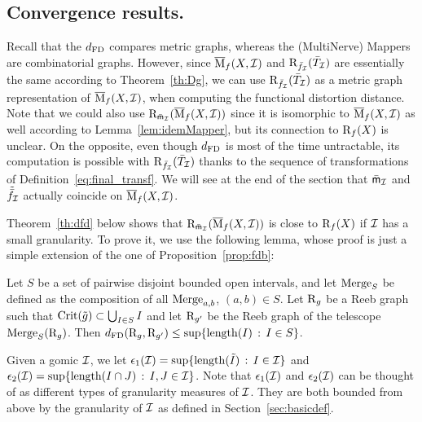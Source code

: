 \subsection{Convergence results.}
\label{sec:dfdconv}

Recall that the $d_{\rm FD}$ compares metric graphs, whereas the (MultiNerve) Mappers
are combinatorial graphs.
However, since $\overline{\mathrm{M}}_f(X,\mathcal{I})$ and $\mathrm{R}_{\bar f_{\mathcal I}}(\bar T_{\mathcal I})$ are essentially the same according to Theorem~\ref{th:Dg},
we can use $\mathrm{R}_{\bar f_{\mathcal I}}(\bar T_{\mathcal I})$ as a metric graph representation of $\overline{\mathrm{M}}_f(X,\mathcal{I})$,   
when computing the functional distortion distance.
Note that we could also use $\mathrm{R}_{\bar {\sf{m}}_{\mathcal I}}(\overline{\mathrm{M}}_f(X,\mathcal{I}))$ since it is isomorphic to $\overline{\mathrm{M}}_f(X,\mathcal{I})$ as well according to Lemma~\ref{lem:idemMapper},
but its connection to $\mathrm{R}_f(X)$ is unclear. %
On the opposite, even though $d_{\rm FD}$ is most of the time untractable, its computation is possible with $\mathrm{R}_{\bar f_{\mathcal I}}(\bar T_{\mathcal I})$
thanks to the sequence of transformations of Definition~\ref{eq:final_transf}.
We will see at the end of the section that $\bar {\sf{m}}_{\mathcal I}$ and $\tilde{\bar f}_{\mathcal I}$ actually coincide on $\overline{\mathrm{M}}_f(X,\mathcal{I})$.

Theorem~\ref{th:dfd} below shows that $\mathrm{R}_{\bar {\sf{m}}_{\mathcal I}}(\overline{\mathrm{M}}_f(X,\mathcal{I}))$ is close to $\mathrm{R}_f(X)$ if $\mathcal{I}$ has a small granularity. To prove it,
we use the following lemma, whose proof is just a simple extension of the one of Proposition~\ref{prop:fdb}:

\begin{lem}\label{lem:dfdmerge}
Let $S$ be a set of pairwise disjoint bounded open intervals, and let $\mathrm{Merge}_S$ be defined as
the composition of all $\mathrm{Merge}_{a,b}$, $(a,b)\in S$. 
Let $\mathrm{R}_g$ be a Reeb graph such that $\mathrm{Crit}(\tilde g)\subset \bigcup_{I\in S} I$
and let $\mathrm{R}_{g'}$ be the Reeb graph
of the telescope $\mathrm{Merge}_S(\mathrm{R}_g)$.
Then $d_{\rm FD}(\mathrm{R}_g,\mathrm{R}_{g'})\leq \sup\{{\rm length}(I)\,:\,I\in S\}$.
\end{lem}

Given a gomic $\mathcal{I}$, we let $\epsilon_1(\mathcal{I})=\sup\{{\rm length}(\tilde I)\,:\,I\in\mathcal{I}\}$ and
$\epsilon_2(\mathcal{I})=\sup\{{\rm length}(I\cap J)\,:\,I,J\in\mathcal{I}\}$. 
Note that $\epsilon_1(\mathcal{I})$ and $\epsilon_2(\mathcal{I})$ can be thought of as different types of granularity measures of $\mathcal{I}$.
They are both bounded from above by the granularity of $\mathcal{I}$ as defined in Section~\ref{sec:basicdef}. 

